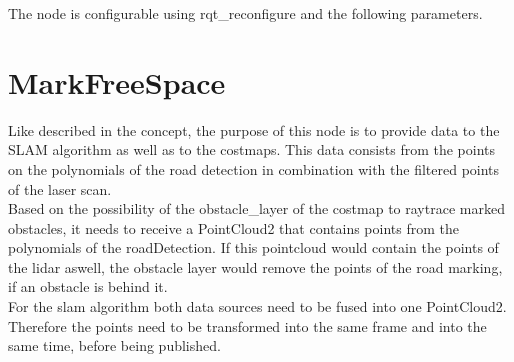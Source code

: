The node is configurable using rqt\_reconfigure and the following parameters.

\begin{table}[H]
\centering
{}

\caption{PoseFined parameters}
\label{posefinderparams}

\end{table}

\section{MarkFreeSpace}

Like described in the concept, the purpose of this node is to provide data to the SLAM algorithm as well as to the costmaps. This data consists from the points on the polynomials of the road detection in combination with the filtered points of the laser scan.\\

Based on the possibility of the obstacle\_layer of the costmap to raytrace marked obstacles, it needs to receive a PointCloud2 that contains points from the polynomials of the roadDetection. If this pointcloud would contain the points of the lidar aswell, the obstacle layer would remove the points of the road marking, if an obstacle is behind it.\\

For the slam algorithm both data sources need to be fused into one PointCloud2. Therefore the points need to be transformed into the same frame and into the same time, before being published.\\


